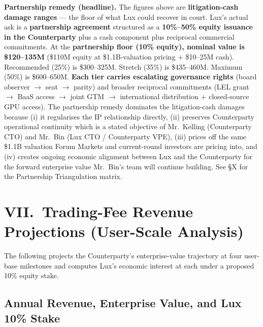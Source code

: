 \documentclass[11pt,letterpaper]{article}
\begin{document}
\textbf{Partnership remedy (headline).} The figures above are
\textbf{litigation-cash damage ranges} --- the floor of what Lux could
recover in court. Lux's actual ask is a \textbf{partnership
agreement} structured as a \textbf{10\%--50\% equity issuance in the
Counterparty} plus a cash component plus reciprocal commercial
commitments. At the \textbf{partnership floor (10\% equity), nominal
value is \$120--135M} (\$110M equity at \$1.1B-valuation pricing +
\$10--25M cash). Recommended (25\%) is \$300--325M. Stretch (35\%) is
\$435--460M. Maximum (50\%) is \$600--650M. \textbf{Each tier carries
escalating governance rights} (board observer $\to$ seat $\to$ parity)
and broader reciprocal commitments (LEL grant $\to$ BaaS access $\to$
joint GTM $\to$ international distribution + closed-source GPU
access). The partnership remedy dominates the litigation-cash damages
because (i) it regularises the IP relationship directly, (ii)
preserves Counterparty operational continuity which is a stated
objective of Mr.\ Kelling (Counterparty CTO) and Mr.\ Bin (Lux CTO /
Counterparty VPE), (iii) prices off the same \$1.1B valuation Forum
Markets and current-round investors are pricing into, and (iv) creates
ongoing economic alignment between Lux and the Counterparty for the
forward enterprise value Mr.\ Bin's team will continue building.
See \S X for the Partnership Triangulation matrix.

\section*{VII.\ Trading-Fee Revenue Projections (User-Scale Analysis)}

The following projects the Counterparty's enterprise-value trajectory
at four user-base milestones and computes Lux's economic interest at
each under a proposed 10\% equity stake.

\subsection*{Annual Revenue, Enterprise Value, and Lux 10\% Stake}
\end{document}
